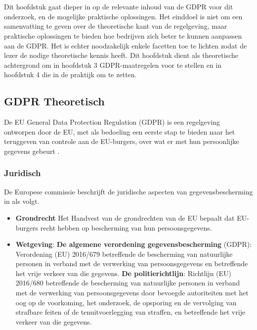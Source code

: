 \chapter{}
\label{ch:stand-van-zaken}



Dit hoofdstuk gaat dieper in op de relevante inhoud van de GDPR voor dit onderzoek, en de mogelijke praktische oplossingen. 
Het einddoel is niet om een samenvatting te geven over de theoretische kant van de regelgeving, maar praktische oplossingen te bieden hoe bedrijven zich beter te kunnen aanpassen aan de GDPR. 
Het is echter noodzakelijk enkele facetten toe te lichten zodat de lezer de nodige theoretische kennis heeft.
Dit hoofdstuk dient als theoretische achtergrond om in hoofdstuk 3 GDPR-maatregelen voor te stellen en in hoofdstuk 4 die in de praktijk om te zetten.
 
 
\section{{GDPR Theoretisch}}

De EU General Data Protection Regulation (GDPR) is een regelgeving ontworpen door de EU, met als bedoeling een eerste stap te bieden naar het teruggeven van controle aan de EU-burgers, over wat er met hun persoonlijke gegevens gebeurt \autocite{Eucom2018} . 

\subsection{Juridisch}
De Europese commissie beschrijft de juridische aspecten van gegevensbescherming in \autocite{Eucom2018} als volgt.

\begin{itemize}
    \item \textbf{Grondrecht} Het Handvest van de grondrechten van de EU bepaalt dat EU-burgers recht hebben op bescherming van hun persoonsgegevens.
    \item \textbf{Wetgeving}: 
    \subitem \textbf{De algemene verordening gegevensbescherming} (GDPR): 
    Verordening (EU) 2016/679 betreffende de bescherming van natuurlijke personen in verband met de verwerking van persoonsgegevens en betreffende het vrije verkeer van die gegevens.
    \subitem \textbf{De politierichtlijn}: 
    Richtlijn (EU) 2016/680 betreffende de bescherming van natuurlijke personen in verband met de verwerking van persoonsgegevens door bevoegde autoriteiten met het oog op de voorkoming, het onderzoek, de opsporing en de vervolging van strafbare feiten of de tenuitvoerlegging van straffen, en betreffende het vrije verkeer van die gegevens.
   
\end{itemize}

